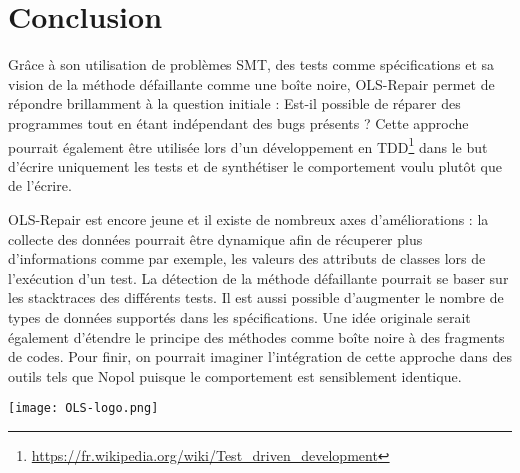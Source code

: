 \chapter*{Conclusion}
	\thispagestyle{conclusion}
	
	
Grâce à son utilisation de problèmes SMT, des tests comme spécifications et sa vision de la méthode défaillante comme une boîte noire, OLS-Repair permet de répondre brillamment à la question initiale : Est-il possible de réparer des programmes tout en étant indépendant des bugs présents ? Cette approche pourrait également être utilisée lors d'un développement en TDD\footnote{\url{https://fr.wikipedia.org/wiki/Test_driven_development}} dans le but d'écrire uniquement les tests et de synthétiser le comportement voulu plutôt que de l'écrire. 
\par OLS-Repair est encore jeune et il existe de nombreux axes d'améliorations :  
la collecte des données pourrait être dynamique afin de récuperer plus d'informations comme par exemple, les valeurs des attributs de classes lors de l'exécution d'un test. 
La détection de la méthode défaillante pourrait se baser sur	 les stacktraces des différents tests.
Il est aussi possible d'augmenter le nombre de types de données supportés dans les spécifications. 
Une idée originale serait également d'étendre le principe des méthodes comme boîte noire à des fragments de codes. Pour finir, on pourrait imaginer l'intégration de cette approche dans des outils tels que Nopol\cite{nopol} puisque le comportement est sensiblement identique.


\begin{center}
	\texttt{[image: OLS-logo.png]}
\end{center}
	
	

